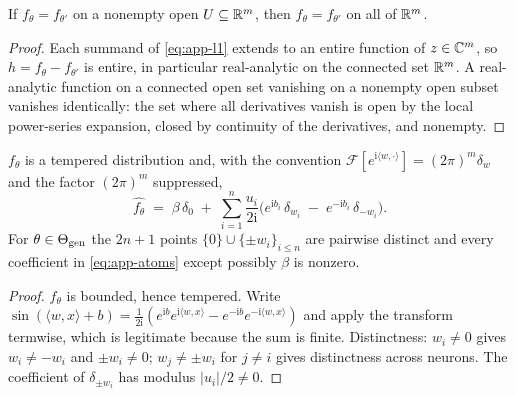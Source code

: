 \begin{lemma}\label{lem:app-analytic}
If $f_\theta = f_{\theta'}$ on a nonempty open $U \subseteq \mathbb{R}^m$, then $f_\theta = f_{\theta'}$
on all of $\mathbb{R}^m$.
\end{lemma}

\begin{proof}
Each summand of \eqref{eq:app-l1} extends to an entire function of $z \in \mathbb{C}^m$, so
$h = f_\theta - f_{\theta'}$ is entire, in particular real-analytic on the connected set $\mathbb{R}^m$. A
real-analytic function on a connected open set vanishing on a nonempty open subset vanishes
identically: the set where all derivatives vanish is open by the local power-series expansion,
closed by continuity of the derivatives, and nonempty.
\end{proof}

\begin{lemma}\label{lem:app-atoms}
$f_\theta$ is a tempered distribution and, with the convention
$\mathcal F[e^{\mathrm i\langle w,\cdot\rangle}] = (2\pi)^m \delta_w$ and the factor $(2\pi)^m$
suppressed,
\begin{equation}
\widehat{f_\theta} \;=\; \beta\,\delta_0 \;+\; \sum_{i=1}^{n} \frac{u_i}{2\mathrm i}
\Big( e^{\mathrm i b_i}\,\delta_{w_i} \;-\; e^{-\mathrm i b_i}\,\delta_{-w_i} \Big).
\label{eq:app-atoms}
\end{equation}
For $\theta \in \Theta_{\mathrm{gen}}$ the $2n+1$ points $\{0\} \cup \{\pm w_i\}_{i \le n}$ are pairwise distinct
and every coefficient in \eqref{eq:app-atoms} except possibly $\beta$ is nonzero.
\end{lemma}

\begin{proof}
$f_\theta$ is bounded, hence tempered. Write
$\sin(\langle w,x\rangle + b) = \frac{1}{2\mathrm i}(e^{\mathrm i b}e^{\mathrm i\langle w,x\rangle}
- e^{-\mathrm i b}e^{-\mathrm i\langle w,x\rangle})$ and apply the transform termwise, which is
legitimate because the sum is finite. Distinctness: $w_i \neq 0$ gives $w_i \neq -w_i$ and
$\pm w_i \neq 0$; $w_j \neq \pm w_i$ for $j\neq i$ gives distinctness across neurons. The
coefficient of $\delta_{\pm w_i}$ has modulus $|u_i|/2 \neq 0$.
\end{proof}

